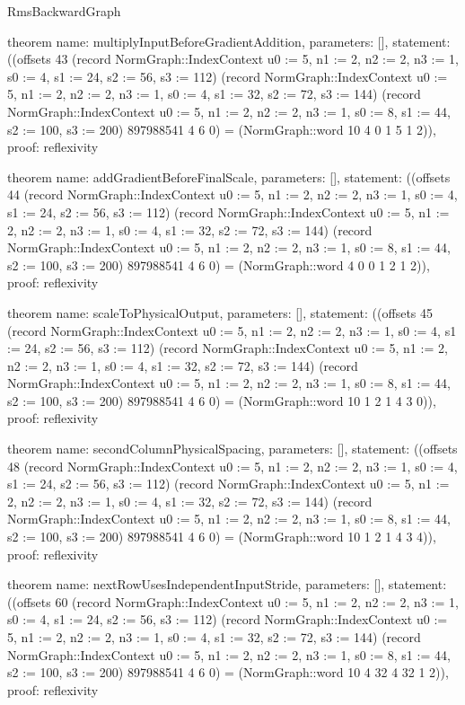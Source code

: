 \begin{lexlean}{RmsBackwardGraph}
\begin{semanticmodule}
theorem{
  name: multiplyInputBeforeGradientAddition,
  parameters: [],
  statement: ((offsets 43 (record NormGraph::IndexContext {u0 := 5, n1 := 2, n2 := 2, n3 := 1, s0 := 4, s1 := 24, s2 := 56, s3 := 112}) (record NormGraph::IndexContext {u0 := 5, n1 := 2, n2 := 2, n3 := 1, s0 := 4, s1 := 32, s2 := 72, s3 := 144}) (record NormGraph::IndexContext {u0 := 5, n1 := 2, n2 := 2, n3 := 1, s0 := 8, s1 := 44, s2 := 100, s3 := 200}) 897988541 4 6 0) = (NormGraph::word 10 4 0 1 5 1 2)),
  proof: reflexivity{}
}

theorem{
  name: addGradientBeforeFinalScale,
  parameters: [],
  statement: ((offsets 44 (record NormGraph::IndexContext {u0 := 5, n1 := 2, n2 := 2, n3 := 1, s0 := 4, s1 := 24, s2 := 56, s3 := 112}) (record NormGraph::IndexContext {u0 := 5, n1 := 2, n2 := 2, n3 := 1, s0 := 4, s1 := 32, s2 := 72, s3 := 144}) (record NormGraph::IndexContext {u0 := 5, n1 := 2, n2 := 2, n3 := 1, s0 := 8, s1 := 44, s2 := 100, s3 := 200}) 897988541 4 6 0) = (NormGraph::word 4 0 0 1 2 1 2)),
  proof: reflexivity{}
}

theorem{
  name: scaleToPhysicalOutput,
  parameters: [],
  statement: ((offsets 45 (record NormGraph::IndexContext {u0 := 5, n1 := 2, n2 := 2, n3 := 1, s0 := 4, s1 := 24, s2 := 56, s3 := 112}) (record NormGraph::IndexContext {u0 := 5, n1 := 2, n2 := 2, n3 := 1, s0 := 4, s1 := 32, s2 := 72, s3 := 144}) (record NormGraph::IndexContext {u0 := 5, n1 := 2, n2 := 2, n3 := 1, s0 := 8, s1 := 44, s2 := 100, s3 := 200}) 897988541 4 6 0) = (NormGraph::word 10 1 2 1 4 3 0)),
  proof: reflexivity{}
}

theorem{
  name: secondColumnPhysicalSpacing,
  parameters: [],
  statement: ((offsets 48 (record NormGraph::IndexContext {u0 := 5, n1 := 2, n2 := 2, n3 := 1, s0 := 4, s1 := 24, s2 := 56, s3 := 112}) (record NormGraph::IndexContext {u0 := 5, n1 := 2, n2 := 2, n3 := 1, s0 := 4, s1 := 32, s2 := 72, s3 := 144}) (record NormGraph::IndexContext {u0 := 5, n1 := 2, n2 := 2, n3 := 1, s0 := 8, s1 := 44, s2 := 100, s3 := 200}) 897988541 4 6 0) = (NormGraph::word 10 1 2 1 4 3 4)),
  proof: reflexivity{}
}

theorem{
  name: nextRowUsesIndependentInputStride,
  parameters: [],
  statement: ((offsets 60 (record NormGraph::IndexContext {u0 := 5, n1 := 2, n2 := 2, n3 := 1, s0 := 4, s1 := 24, s2 := 56, s3 := 112}) (record NormGraph::IndexContext {u0 := 5, n1 := 2, n2 := 2, n3 := 1, s0 := 4, s1 := 32, s2 := 72, s3 := 144}) (record NormGraph::IndexContext {u0 := 5, n1 := 2, n2 := 2, n3 := 1, s0 := 8, s1 := 44, s2 := 100, s3 := 200}) 897988541 4 6 0) = (NormGraph::word 10 4 32 4 32 1 2)),
  proof: reflexivity{}
}


\end{semanticmodule}
\end{lexlean}
